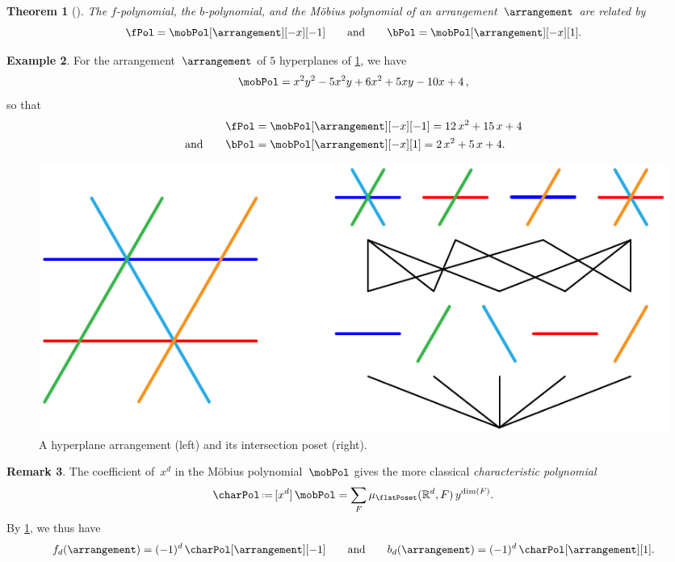 \documentclass{amsart}
\newcommand{\darkblue}{\color{darkblue}} %
\newtheorem{theorem}{Theorem}[section]
\theoremstyle{definition}
\newtheorem{example}[theorem]{Example}
\newtheorem{remark}[theorem]{Remark}
\newcommand{\R}{\mathbb{R}} %
\newcommand{\eqdef}{\mbox{\,\raisebox{0.2ex}{\scriptsize\ensuremath{\mathrm:}}\ensuremath{=}\,}} %
\newcommand{\defn}[1]{\textsl{\darkblue #1}} %
\begin{document}
\begin{theorem}[{\cite[Thm.~A]{Zaslavsky}}]
\label{thm:Zaslavsky}
The $f$-polynomial, the $b$-polynomial, and the M\"obius polynomial of an arrangement~$\arrangement$ are related by
\[
\fPol = \mobPol[\arrangement][-x][-1]
\qquad\text{and}\qquad
\bPol = \mobPol[\arrangement][-x][1].
\]
\end{theorem}

\begin{example}
For the arrangement~$\arrangement$ of $5$ hyperplanes of \cref{fig:arrangement}, we have
\[
\mobPol = x^2y^2 - 5x^2y + 6x^2 + 5xy - 10x + 4 \, ,
\]
so that
\begin{align*}
\fPol & = \mobPol[\arrangement][-x][-1] = 12 \, x^2 + 15 \, x + 4 \\
\text{and}\qquad
\bPol & = \mobPol[\arrangement][-x][1] = 2 \, x^2 + 5 \, x + 4.
\end{align*}
%
\begin{figure}
	\centerline{\includegraphics[scale=.9]{intersectionPoset}}
	\caption{A hyperplane arrangement (left) and its intersection poset (right).}
	\label{fig:arrangement}
\end{figure}
\end{example}

\begin{remark}
\label{rem:characteristicPolynomial}
The coefficient of~$x^d$ in the M\"obius polynomial~$\mobPol$ gives the more classical \defn{characteristic polynomial}
\[
\charPol \eqdef [x^d] \, \mobPol = \sum_F \mu_{\flatPoset}(\R^d,F) \, y^{\dim(F)}.
\]
By \cref{thm:Zaslavsky}, we thus have
\[
f_d(\arrangement) = (-1)^d \, \charPol[\arrangement][-1] 
\qquad\text{and}\qquad
b_d(\arrangement) = (-1)^d \, \charPol[\arrangement][1].
\]
\end{remark}
\end{document}
